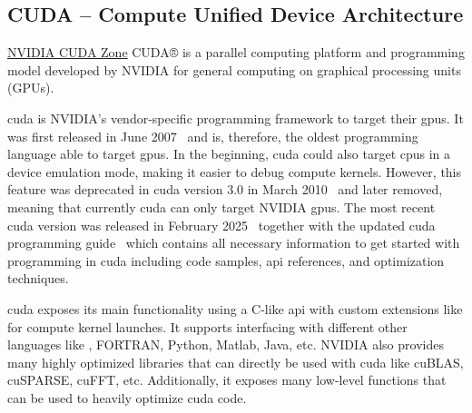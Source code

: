 \subsection{CUDA -- Compute Unified Device Architecture}
\label{sec:frameworks:cuda}

\begin{quotebox}{\href{https://developer.nvidia.com/cuda-zone}{NVIDIA CUDA Zone}}
    CUDA® is a parallel computing platform and programming model developed by NVIDIA for general computing on graphical processing units (GPUs).
\end{quotebox}

\acrfull{cuda} is NVIDIA's vendor-specific programming framework to target their \glspl{gpu}. 
It was first released in June 2007~\cite{nvidia_corporation_cuda_2007} and is, therefore, the oldest programming language able to target \glspl{gpu}. 
In the beginning, \gls{cuda} could also target \glspl{cpu} in a device emulation mode, making it easier to debug compute kernels. 
However, this feature was deprecated in \gls{cuda} version 3.0 in March 2010~\cite{nvidia_corporation_cuda_2010} and later removed, meaning that currently \gls{cuda} can only target NVIDIA \glspl{gpu}. 
The most recent \gls{cuda} version was released in February 2025~\cite{nvidia_corporation_cuda_2025-1} together with the updated \gls{cuda} \cpp programming guide~\cite{nvidia_corporation_cuda_2025} which contains all necessary information to get started with programming in \gls{cuda} including code samples, \gls{api} references, and optimization techniques. 

\gls{cuda} exposes its main functionality using a C-like \gls{api} with custom extensions like  for compute kernel launches. 
It supports interfacing with different other languages like \cpp, FORTRAN, Python, Matlab, Java, etc. 
NVIDIA also provides many highly optimized libraries that can directly be used with \gls{cuda} like cuBLAS, cuSPARSE, cuFFT, etc. 
Additionally, it exposes many low-level functions that can be used to heavily optimize \gls{cuda} code. 

